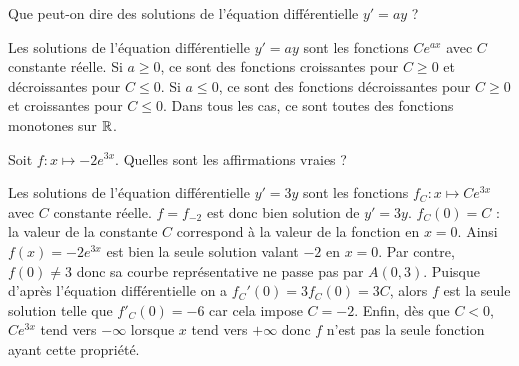 \begin{question}
Que peut-on dire des solutions de l'équation différentielle $y'=ay$ ?
\begin{answers}
\end{answers}
\begin{explanations}
Les solutions de l'équation différentielle $y'=ay$ sont les fonctions $C e^{ax}$ avec $C$ constante réelle. Si $a\ge 0$, ce sont des fonctions croissantes pour $C\ge 0$ et décroissantes pour $C\le 0$. Si $a\le 0$, ce sont des fonctions décroissantes pour $C\ge 0$ et croissantes pour $C\le0$. Dans tous les cas, ce sont toutes des fonctions monotones sur $\mathbb{R}$.
\end{explanations}
\end{question}


\begin{question}
Soit $f: x\mapsto -2 e^{3x}$. Quelles sont les affirmations vraies ?
\begin{answers}
\end{answers}
\begin{explanations} 
Les solutions de l'équation différentielle $y'=3y$ sont les fonctions $f_C:x\mapsto C e^{3x}$ avec $C$ constante réelle. $f=f_{-2}$ est donc bien solution de $y'=3y$. $f_C(0)=C$ : la valeur de la constante $C$ correspond à la valeur de la fonction en $x=0$. Ainsi $f(x) = -2e^{3x}$ est bien la seule solution valant $-2$ en $x=0$. Par contre, $f(0)\ne 3$ donc sa courbe représentative ne passe pas par $A(0,3)$. Puisque d'après l'équation différentielle on a $f_C'(0)=3 f_C(0) = 3C$, alors $f$ est la seule solution telle que $f'_C(0)=-6$ car cela impose $C=-2$. Enfin, dès que $C<0$, $C e^{3x}$ tend vers $-\infty$ lorsque $x$ tend vers $+\infty$ donc $f$ n'est pas la seule fonction ayant cette propriété.
\end{explanations}
\end{question}


